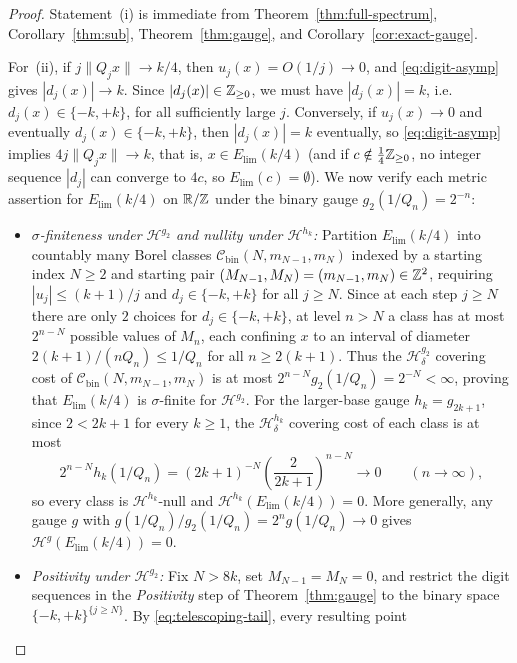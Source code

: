 \begin{proof}
Statement~(i) is immediate from Theorem~\ref{thm:full-spectrum},
Corollary~\ref{thm:sub}, Theorem~\ref{thm:gauge}, and
Corollary~\ref{cor:exact-gauge}.

For~(ii), if $j\|Q_jx\|\to k/4$, then $u_j(x)=O(1/j)\to0$, and
\eqref{eq:digit-asymp} gives $|d_j(x)|\to k$. Since $|d_j(x)|\in\mathbb{Z}_{\ge0}$, we
must have $|d_j(x)|=k$, i.e.\ $d_j(x)\in\{-k,+k\}$, for all sufficiently large
$j$. Conversely, if $u_j(x)\to0$ and eventually $d_j(x)\in\{-k,+k\}$, then
$|d_j(x)|=k$ eventually, so \eqref{eq:digit-asymp} implies $4j\|Q_jx\|\to k$,
that is, $x\in E_{\mathrm{lim}}(k/4)$ (and if $c\notin\frac14\mathbb{Z}_{\ge0}$, no
integer sequence $|d_j|$ can converge to $4c$, so $E_{\mathrm{lim}}(c)=\emptyset$).
We now verify each metric assertion for $E_{\mathrm{lim}}(k/4)$ on $\mathbb{R}/\mathbb{Z}$ under
the binary gauge $g_2(1/Q_n)=2^{-n}$:
\begin{itemize}[leftmargin=1.8em]
\item \emph{$\sigma$-finiteness under $\mathcal H^{g_2}$ and nullity under $\mathcal H^{h_k}$:}
Partition $E_{\mathrm{lim}}(k/4)$ into countably many Borel classes
$\mathcal C_{\mathrm{bin}}(N,m_{N-1},m_N)$ indexed by a starting index $N\ge2$
and starting pair $(M_{N-1},M_N)=(m_{N-1},m_N)\in\mathbb{Z}^2$, requiring
$|u_j|\le(k+1)/j$ and $d_j\in\{-k,+k\}$ for all $j\ge N$. Since at each step
$j\ge N$ there are only $2$ choices for $d_j\in\{-k,+k\}$, at level $n>N$ a
class has at most $2^{n-N}$ possible values of $M_n$, each confining $x$ to an
interval of diameter $2(k+1)/(nQ_n)\le1/Q_n$ for all $n\ge2(k+1)$. Thus the
$\mathcal H_\delta^{g_2}$ covering cost of $\mathcal C_{\mathrm{bin}}(N,m_{N-1},m_N)$
is at most $2^{n-N}g_2(1/Q_n)=2^{-N}<\infty$, proving that
$E_{\mathrm{lim}}(k/4)$ is $\sigma$-finite for $\mathcal H^{g_2}$. For the
larger-base gauge $h_k=g_{2k+1}$, since $2<2k+1$ for every $k\ge1$, the
$\mathcal H_\delta^{h_k}$ covering cost of each class is at most
\[
2^{n-N}h_k(1/Q_n)=(2k+1)^{-N}\left(\frac{2}{2k+1}\right)^{n-N}\longrightarrow0
\qquad(n\to\infty),
\]
so every class is $\mathcal H^{h_k}$-null and
$\mathcal H^{h_k}(E_{\mathrm{lim}}(k/4))=0$. More generally, any gauge $g$ with
$g(1/Q_n)/g_2(1/Q_n)=2^ng(1/Q_n)\to0$ gives
$\mathcal H^g(E_{\mathrm{lim}}(k/4))=0$.
\item \emph{Positivity under $\mathcal H^{g_2}$:}
Fix $N>8k$, set $M_{N-1}=M_N=0$, and restrict the digit sequences in the
\emph{Positivity} step of Theorem~\ref{thm:gauge} to the binary space
$\{-k,+k\}^{\{j\ge N\}}$. By \eqref{eq:telescoping-tail}, every resulting point

\end{itemize}
\end{proof}
